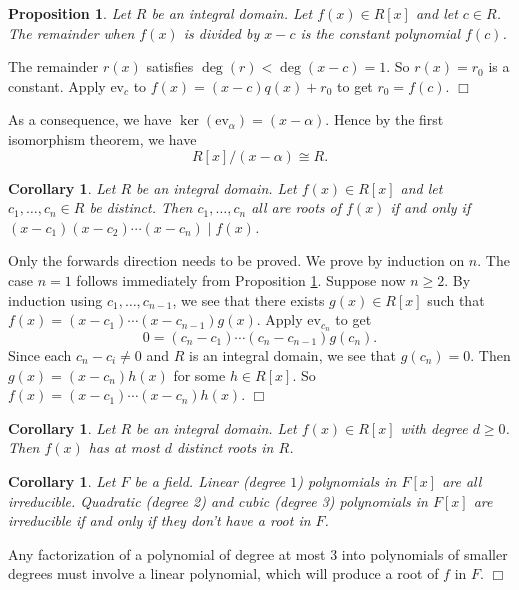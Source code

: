 \documentclass{article}
\newtheorem{cor}[subsection]{Corollary}
\newtheorem{proposition}[subsection]{Proposition}
\newenvironment{proof}{\noindent {\bf Proof:}}{$\Box$ \vspace{2 ex}}
\begin{document}
\begin{proposition}\label{prop:rem}
    Let $R$ be an integral domain. Let $f(x)\in R[x]$ and let $c\in R$. The remainder when $f(x)$ is divided by $x - c$ is the constant polynomial $f(c)$.
\end{proposition}

\begin{proof}
    The remainder $r(x)$ satisfies $\deg(r) < \deg(x - c) = 1$. So $r(x) = r_0$ is a constant. Apply $\text{ev}_c$ to $f(x) = (x - c)q(x) + r_0$ to get $r_0 = f(c)$.
\end{proof}

As a consequence, we have $\ker(\text{ev}_\alpha) = (x - \alpha)$. Hence by the first isomorphism theorem, we have
$$R[x]/(x-\alpha)\cong R.$$

\begin{cor}
    Let $R$ be an integral domain. Let $f(x)\in R[x]$ and let $c_1,\ldots,c_n\in R$ be distinct. Then $c_1,\ldots,c_n$ all are roots of $f(x)$ if and only if $(x - c_1)(x - c_2)\cdots(x - c_n) \mid f(x)$.
\end{cor}

\begin{proof}
    Only the forwards direction needs to be proved. We prove by induction on $n$. The case $n = 1$ follows immediately from Proposition \ref{prop:rem}. Suppose now $n\geq 2$. By induction using $c_1,\ldots,c_{n-1}$, we see that there exists $g(x)\in R[x]$ such that $f(x) = (x - c_1)\cdots(x - c_{n-1})g(x)$. Apply $\text{ev}_{c_n}$ to get $$0 = (c_n-c_1)\cdots(c_n-c_{n-1})g(c_n).$$
    Since each $c_n - c_i\neq 0$ and $R$ is an integral domain, we see that $g(c_n) = 0$. Then $g(x) = (x - c_n)h(x)$ for some $h\in R[x]$. So $f(x) = (x - c_1)\cdots(x - c_n)h(x)$.
\end{proof}

\begin{cor}
    Let $R$ be an integral domain. Let $f(x)\in R[x]$ with degree $d\geq0$. Then $f(x)$ has at most $d$ distinct roots in $R$.
\end{cor}

\begin{cor}
    Let $F$ be a field. Linear (degree $1$) polynomials in $F[x]$ are all irreducible. Quadratic (degree 2) and cubic (degree 3) polynomials in $F[x]$ are irreducible if and only if they don't have a root in $F$.
\end{cor}

\begin{proof}
    Any factorization of a polynomial of degree at most $3$ into polynomials of smaller degrees must involve a linear polynomial, which will produce a root of $f$ in $F$.
\end{proof}
\end{document}
